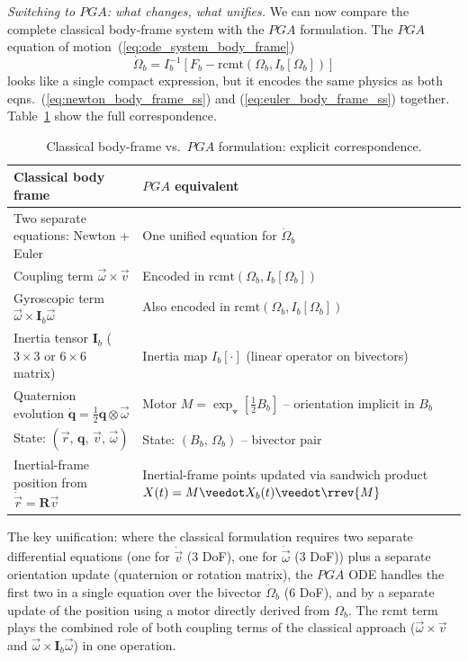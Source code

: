 \newpage

\emph{Switching to $PGA$: what changes, what unifies.}
We can now compare the complete classical body-frame system with the $PGA$ formulation.
The $PGA$ equation of motion~(\ref{eq:ode_system_body_frame})
\begin{equation*}
    \dot{\Omega}_b = I_b^{-1}\!\left[ F_b - \mathrm{rcmt}(\Omega_b, I_b[\Omega_b]) \right]
\end{equation*}
looks like a single compact expression, but it encodes the same physics as both
eqns.~(\ref{eq:newton_body_frame_ss}) and (\ref{eq:euler_body_frame_ss}) together.
Table~\ref{tab:classical_vs_pga} show the full correspondence.

\begin{table}[!ht]
\centering\small
\begin{tabular}{p{6.0cm}|p{6.5cm}}
\hline
Classical body frame &
$PGA$ equivalent \\
\hline
Two separate equations: Newton + Euler &
One unified equation for $\dot{\Omega}_b$ \\
Coupling term $\vec{\omega}\times\vec{v}$ &
Encoded in $\mathrm{rcmt}(\Omega_b, I_b[\Omega_b])$ \\
Gyroscopic term $\vec{\omega}\times\mathbf{I}_b\vec{\omega}$ &
Also encoded in $\mathrm{rcmt}(\Omega_b, I_b[\Omega_b])$ \\
Inertia tensor $\mathbf{I}_b$ ($3\times3$ or $6\times6$ matrix) &
Inertia map $I_b[\cdot]$ (linear operator on bivectors) \\
Quaternion evolution $\dot{\mathbf{q}} = \frac{1}{2}\mathbf{q}\otimes\vec{\omega}$ &
Motor $M = \exp_\veedot[\frac{1}{2} B_b]$ -- orientation implicit in $B_b$ \\
State: $(\vec{r},\, \mathbf{q},\, \vec{v},\, \vec{\omega})$ &
State: $(B_b,\, \Omega_b)$ -- bivector pair \\
Inertial-frame position from $\dot{\vec{r}} = \mathbf{R}\vec{v}$ &
Inertial-frame points updated via sandwich product
$X(t) = M \veedot X_b(t) \veedot \rrev{M} $ \\
\hline
\end{tabular}
\caption{Classical body-frame vs.\ $PGA$ formulation: explicit correspondence.}
\label{tab:classical_vs_pga}
\end{table}

The key unification: where the classical formulation requires two separate differential
equations (one for $\dot{\vec{v}}$ (3 DoF), one for $\dot{\vec{\omega}}$ (3 DoF)) plus a
separate orientation update (quaternion or rotation matrix), the $PGA$ ODE handles the
first two in a single equation over the bivector $\dot{\Omega}_b$ (6 DoF), and by a
separate update of the position using a motor directly derived from $\Omega_b$. The
$\mathrm{rcmt}$ term plays the combined role of both coupling terms of the classical
approach ($\vec{\omega}\times\vec{v}$ and $\vec{\omega}\times\mathbf{I}_b\vec{\omega}$) in
one operation.

